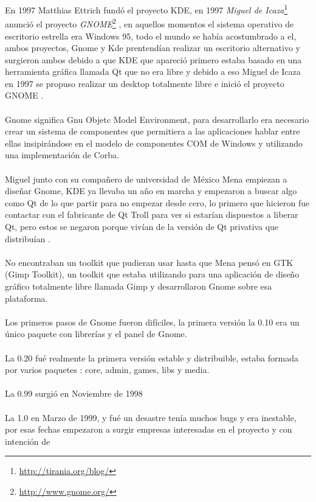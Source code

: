 \documentclass[a4paper,oneside,11pt]{article}
\begin{document}
En 1997 Matthias Ettrich fund\'o el proyecto KDE, en 1997 \emph{Miguel de Icaza}\footnote{\url{http://tirania.org/blog/}} anunci\'o el 
proyecto \emph{GNOME}\footnote{\url{http://www.gnome.org/}} , en aquellos momentos el sistema operativo de escritorio estrella
era Windows 95, todo el mundo se hab\'ia acostumbrado a el, ambos proyectos, Gnome
y Kde prentend\'ian realizar un escritorio alternativo y surgieron ambos debido a que
KDE que apareci\'o primero estaba basado en una herramienta gr\'afica llamada Qt que no 
era libre y debido a eso Miguel de Icaza en 1997 se propuso realizar un desktop totalmente
libre e inici\'o el proyecto GNOME .
\\\\
Gnome significa Gnu Objetc Model Environment, para desarrollarlo era necesario crear
un sistema de componentes que permitiera a las aplicaciones hablar entre ellas insipir\'andose
en el modelo de componentes COM de Windows y utilizando una implementaci\'on de Corba.
\\\\
Miguel junto con su compañero de universidad de M\'exico Mena empiezan a diseñar Gnome,
KDE ya llevaba un año en marcha y empezaron a buscar algo como Qt de lo que partir para no
empezar desde cero, lo primero que hicieron fue contactar con el fabricante de Qt Troll
para ver si estar\'ian dispuestos a liberar Qt, pero estos se negaron porque viv\'ian
de la versi\'on de Qt privativa que distribu\'ian .
\\\\
No encontraban un toolkit que pudieran usar hasta que Mena pens\'o en GTK (Gimp Toolkit), un toolkit que 
estaba utilizando para una aplicaci\'on de diseño gr\'afico totalmente libre llamada Gimp
y desarrollaron Gnome sobre esa plataforma.
\\\\
Los primeros pasos de Gnome fueron dif\'iciles, la primera versi\'on la 0.10 era un
\'unico paquete con librer\'ias y el panel de Gnome.
\\\\
La 0.20 fu\'e realmente la primera versi\'on estable y distribuible, estaba formada por
varios paquetes : core, admin, games, libs y media.
\\\\
La 0.99 surgi\'o en Noviembre de 1998
\\\\
La 1.0 en Marzo de 1999, y fu\'e un desastre ten\'ia muchos bugs y era inestable, por
esas fechas empezaron a surgir empresas interesadas en el proyecto y con intenci\'on de 
\end{document}
